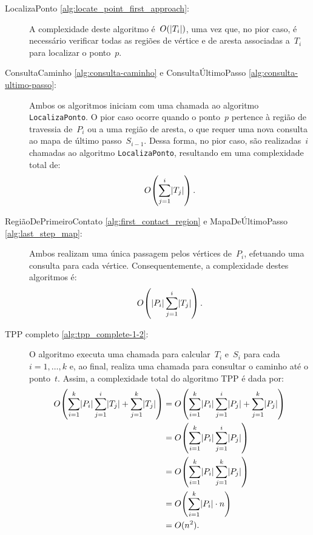 \documentclass[11pt]{article}
\newcommand{\algref}[1]{\ref{#1}}
\DeclarePairedDelimiter{\abs}{\lvert}{\rvert}
\begin{document}
\begin{description}

	\item[LocalizaPonto \algref{alg:locate_point_first_approach}:] A complexidade deste algoritmo é~\(O(\abs{T_i})\), uma vez que, no pior caso, é necessário verificar todas as regiões de vértice e de aresta associadas a~\(T_i\) para localizar o ponto~\(p\).

	\item[ConsultaCaminho \algref{alg:consulta-caminho} e ConsultaÚltimoPasso \algref{alg:consulta-ultimo-passo}:] Ambos os algoritmos iniciam com uma chamada ao algoritmo \texttt{LocalizaPonto}. O pior caso ocorre quando o ponto~\(p\) pertence à região de travessia de~\(P_i\) ou a uma região de aresta, o que requer uma nova consulta ao mapa de último passo~\(S_{i-1}\). Dessa forma, no pior caso, são realizadas~\(i\) chamadas ao algoritmo \texttt{LocalizaPonto}, resultando em uma complexidade total de: 
	\[
		O\!\left(\sum_{j = 1}^{i} \abs{T_j}\right).
	\]

	\item[RegiãoDePrimeiroContato \algref{alg:first_contact_region} e MapaDeÚltimoPasso \algref{alg:last_step_map}:] Ambos realizam uma única passagem pelos vértices de~\(P_i\), efetuando uma consulta para cada vértice. Consequentemente, a complexidade destes algoritmos é:
	\[
		O\!\left(\abs{P_i} \sum_{j = 1}^{i} \abs{T_j}\right).
	\]

	\item[TPP completo \algref{alg:tpp_complete-1-2}:] O algoritmo executa uma chamada para calcular~\(T_i\) e~\(S_i\) para cada~\(i = 1, \dots, k\) e, ao final, realiza uma chamada para consultar o caminho até o ponto~\(t\). Assim, a complexidade total do algoritmo TPP é dada por:
	\allowdisplaybreaks
	\begin{align*}
		O\!\left(\sum_{i = 1}^{k} \abs{P_i} \sum_{j = 1}^{i} \abs{T_j} + \sum_{j = 1}^{k} \abs{T_j}\right)
		&= O\!\left(\sum_{i = 1}^{k} \abs{P_i} \sum_{j = 1}^{i} \abs{P_j} + \sum_{j = 1}^{k} \abs{P_j}\right) \\
		&= O\!\left(\sum_{i = 1}^{k} \abs{P_i} \sum_{j = 1}^{i} \abs{P_j}\right) \\
		&= O\!\left(\sum_{i = 1}^{k} \abs{P_i} \sum_{j = 1}^{k} \abs{P_j}\right) \\
		&= O\!\left(\sum_{i = 1}^{k} \abs{P_i} \cdot n\right) \\
		&= O(n^2).
	\end{align*}

\end{description}
\end{document}
